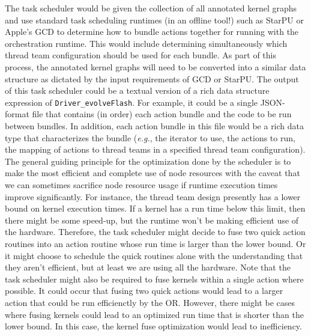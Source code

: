 \documentclass{article}
\newcommand{\code}[1]{{\tt#1}}
\newcommand{\eg}{\textit{e.g.}}   %
\newcommand{\shortOR}   {OR\xspace}
\newcommand{\OR}        {\shortOR}
\begin{document}
The task scheduler would be given the collection of all annotated kernel graphs
and use standard task scheduling runtimes (in an offline tool!) such as StarPU
or Apple's GCD to determine how to bundle actions together for running with the
orchestration runtime.  This would include determining simultaneously which
thread team configuration should be used for each bundle.  As part of this
process, the annotated kernel graphs will need to be converted into a similar
data structure as dictated by the input requirements of GCD or StarPU.  The
output of this task scheduler could be a textual version of a rich data
structure expression of \code{Driver\_evolveFlash}.  For example, it could be a
single JSON-format file that contains (in order) each action bundle and the code
to be run between bundles.  In addition, each action bundle in this file would
be a rich data type that characterizes the bundle (\eg, the iterator to use, the
actions to run, the mapping of actions to thread teams in a specified thread
team configuration).\\

The general guiding principle for the optimization done by the scheduler is to
make the most efficient and complete use of node resources with the caveat that
we can sometimes sacrifice node resource usage if runtime execution times improve
significantly.  For instance, the thread team design presently has a lower bound
on kernel execution times.  If a kernel has a run time
below this limit, then there might be some speed-up, but the runtime won't be
making efficient use of the hardware.  Therefore, the task scheduler might
decide to fuse two quick action routines into an action routine whose run time is larger
than the lower bound.  Or it might choose to schedule the quick routines alone
with the understanding that they aren't efficient, but at least we are using all
the hardware.  Note that the task scheduler might also be required to fuse
kernels within a single action where possible.  It could occur that fusing two
quick actions would lead to a larger action that could be run efficienctly by
the \OR.  However, there might be cases where fusing kernels could lead to an
optimized run time that is shorter than the lower bound.  In this case, the
kernel fuse optimization would lead to inefficiency.\\
\end{document}
